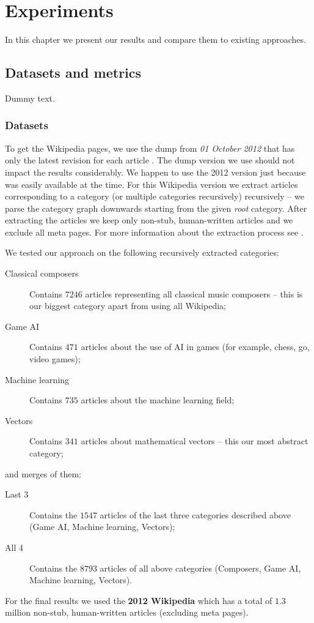 \chapter{Experiments}

In this chapter we present our results and compare them to existing approaches.

\section{Datasets and metrics}

Dummy text.

\subsection{Datasets}

To get the Wikipedia pages, we use the dump from \emph{01 October 2012} that
has only the latest revision for each article . The dump version we use should not impact the results considerably. We
happen to use the 2012 version just because was easily available at the time.
For this Wikipedia version we extract articles corresponding to a category (or
multiple categories recursively) recursively -- we parse the category graph
downwards starting from the given \emph{root} category. After extracting the
articles we keep only non-stub, human-written articles and we exclude all meta
pages. For more information about the extraction process see
.

We tested our approach on the following recursively extracted categories:
\begin{description}
  \item[Classical composers] Contains \(7246\) articles representing all
  classical music composers -- this is our biggest category apart from using all
  Wikipedia;
  \item[Game \acl{AI}] Contains \(471\) articles about the use
  of \ac{AI} in games (for example, chess, go, video games);
  \item[Machine learning] Contains \(735\) articles about the machine learning
  field;
  \item[Vectors] Contains \(341\) articles about mathematical vectors -- this
  our most abstract category;
\end{description}
and merges of them:
\begin{description}
  \item[Last 3] Contains the \(1547\) articles of the last three categories
  described above (Game \ac{AI}, Machine learning, Vectors);
  \item[All 4] Contains the \(8793\) articles of all above categories
  (Composers, Game \ac{AI}, Machine learning, Vectors).
\end{description}
For the final results we used the \textbf{2012 Wikipedia} which has a total of
\(1.3\) million  non-stub, human-written
articles (excluding meta pages).

